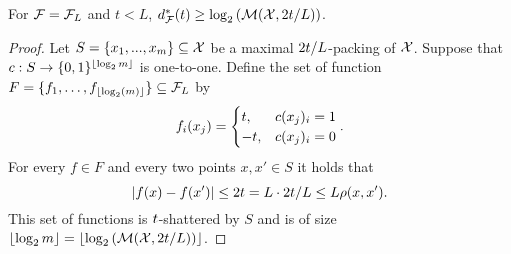 \begin{lemma}
  For $\mathcal{F}=\mathcal{F}_L$ and $t<L$,
  $d^*_{\mathcal{F}}(t)  \geq \log_2\left(\mathcal{M}(\mathcal{X},2t/L)\right)$.
\end{lemma}
\begin{proof}
  Let $S=\{x_1,...,x_m\} \subseteq \mathcal{X}$
  be a maximal
  $2t/L$-packing
of $\mathcal{X}$.
Suppose that
$c: S \to \{0,1\}^{\left\lfloor\log_2m\right\rfloor}$
is one-to-one.
Define the set of function $F = \{f_1,\ldots,f_{\left\lfloor\log_2(m)\right\rfloor}\} \subseteq \mathcal{F}_L$ by
  \[
    f_i(x_j) =
    \begin{cases}
      t, & c(x_j)_i = 1 \\
      -t, & c(x_j)_i = 0
    \end{cases}.
  \]
  For every $f \in F$ and every two points $x,x' \in S$ it holds that
  \[\lvert f(x) - f(x')\rvert \leq 2t = L \cdot 2t / L \leq L  \rho(x,x').\]
  This set of functions is $t$-shattered by $S$
  and is of size
  $\left\lfloor\log_2m\right\rfloor = \left\lfloor\log_2\left(\mathcal{M}(\mathcal{X},2t/L)\right)\right\rfloor$.
\end{proof}


    



